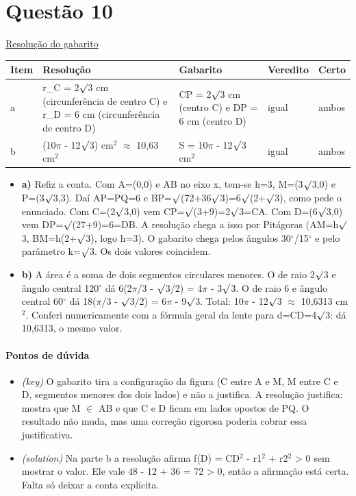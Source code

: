 \documentclass{article}%
\begin{document}
\section*{Questão 10}%
\href{https://poliedroresolve.sistemapoliedro.com.br/vestibulares/ita/2026/ita-2-fase-dia-1-28-10-2025-2-fase-dia-1/dissertativa-10-matematica-2-fase-dia-1-ita-2026}{Resolução do gabarito}\par\smallskip%
\begin{longtable}{@{}p{} p{} p{} p{} p{}@{}}\toprule Item & Resolução & Gabarito & Veredito & Certo \\ \midrule
a & r\_C = 2$\surd$3 cm (circunferência de centro C) e r\_D = 6 cm (circunferência de centro D) & CP = 2$\surd$3 cm (centro C) e DP = 6 cm (centro D) & igual & ambos \\
b & (10$\pi$ - 12$\surd$3) cm$^2$ $\approx$ 10,63 cm$^2$ & S = 10$\pi$ - 12$\surd$3 cm$^2$ & igual & ambos \\
\bottomrule\end{longtable}%
\begin{itemize}%
\item%
\textbf{a)} Refiz a conta. Com A=(0,0) e AB no eixo x, tem{-}se h=3, M=(3$\surd$3,0) e P=(3$\surd$3,3). Daí AP=PQ=6 e BP=$\surd$(72+36$\surd$3)=6$\surd$(2+$\surd$3), como pede o enunciado. Com C=(2$\surd$3,0) vem CP=$\surd$(3+9)=2$\surd$3=CA. Com D=(6$\surd$3,0) vem DP=$\surd$(27+9)=6=DB. A resolução chega a isso por Pitágoras (AM=h$\surd$3, BM=h(2+$\surd$3), logo h=3). O gabarito chega pelos ângulos 30$^\circ$/15$^\circ$ e pelo parâmetro k=$\surd$3. Os dois valores coincidem.%
\item%
\textbf{b)} A área é a soma de dois segmentos circulares menores. O de raio 2$\surd$3 e ângulo central 120$^\circ$ dá 6(2$\pi$/3 - $\surd$3/2) = 4$\pi$ - 3$\surd$3. O de raio 6 e ângulo central 60$^\circ$ dá 18($\pi$/3 - $\surd$3/2) = 6$\pi$ - 9$\surd$3. Total: 10$\pi$ - 12$\surd$3 $\approx$ 10,6313 cm$^2$. Conferi numericamente com a fórmula geral da lente para d=CD=4$\surd$3: dá 10,6313, o mesmo valor.%
\end{itemize}%
\paragraph{Pontos de dúvida}%
\begin{itemize}%
\item%
\textit{(key)} O gabarito tira a configuração da figura (C entre A e M, M entre C e D, segmentos menores dos dois lados) e não a justifica. A resolução justifica: mostra que M $\in$ AB e que C e D ficam em lados opostos de PQ. O resultado não muda, mas uma correção rigorosa poderia cobrar essa justificativa.%
\item%
\textit{(solution)} Na parte b a resolução afirma f(D) = CD$^2$ - r1$^2$ + r2$^2$ > 0 sem mostrar o valor. Ele vale 48 - 12 + 36 = 72 > 0, então a afirmação está certa. Falta só deixar a conta explícita.%
\end{itemize}%
\end{document}

